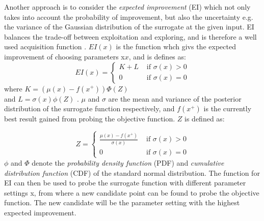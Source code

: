 Another approach is to consider the \emph{expected improvement} (EI) which not only takes into account the probability of improvement, but also the uncertainty e.g. the variance of the Gaussian distribution of the surrogate at the given input. EI balances the trade-off between exploitation and exploring, and is therefore a well used acquisition function \citet{brochu2010tutorial}. $EI(x)$ is the function whch givs the expected improvement of choosing parameters x$x$, and is defines as:
\begin{equation}
\label{eq:expected-improvement}
EI(x) =
\begin{cases}
   K + L & \text{ if } \sigma(x) > 0\\
   0 	  & \text{ if } \sigma(x) = 0
\end{cases}
\end{equation}
where $K = (\mu(x) - f(x^+))\Phi(Z)$ \\and $L = \sigma(x)\phi(Z)$ .
$\mu$ and $\sigma$ are the mean and variance of the posterior distribution of the surrogate function respectively, and $f(x^+)$ is the currently best result gained from probing the objective function. $Z$ is defined as:

\begin{equation}
\label{eq:expect-z}
Z =
\begin{cases}
\frac{\mu(x) - f(x^+)}{\sigma(x)} & \text{ if } \sigma(x) > 0\\
0 								  & \text{ if } \sigma(x) = 0
\end{cases}
\end{equation}
$\phi$ and $\Phi$ denote the \emph{probability density function} (PDF) and \emph{cumulative distribution function} (CDF) of the standard normal distribution.
The function for EI can then be used to probe the surrogate function with different parameter settings x, from where a new candidate point can be found to probe the objective function. The new candidate will be the parameter setting with the highest expected improvement.  


